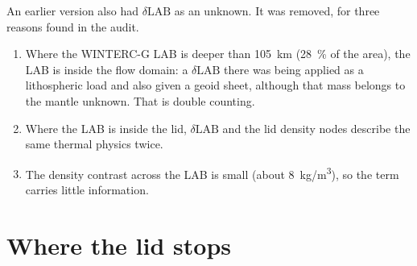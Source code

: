 An earlier version also had $\delta\mathrm{LAB}$ as an unknown.
It was removed, for three reasons found in the audit.
\begin{enumerate}[nosep]
\item Where the WINTERC-G LAB is deeper than \qty{105}{km} (\qty{28}{\percent} of the area), the LAB is inside the flow domain: a $\delta\mathrm{LAB}$ there was being applied as a lithospheric load and also given a geoid sheet, although that mass belongs to the mantle unknown.
That is double counting.
\item Where the LAB is inside the lid, $\delta\mathrm{LAB}$ and the lid density nodes describe the same thermal physics twice.
\item The density contrast across the LAB is small (about \qty{8}{kg/m^3}), so the term carries little information.
\end{enumerate}

\section{Where the lid stops}

